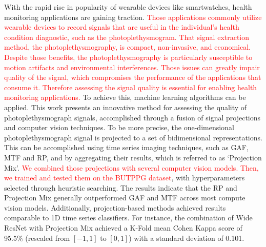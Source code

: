 

With the rapid rise in popularity of wearable devices like smartwatches, health monitoring applications are gaining traction. 
\textcolor{red}{Those applications commonly utilize wearable devices to record signals that are useful in the individual's health condition diagnostic, such as the photoplethysmogram. That signal extraction method, the photoplethysmography, is compact, non-invasive, and economical. Despite those benefits, the photoplethysmography is particularly susceptible to motion artifacts and environmental interferences. Those issues can greatly impair quality of the signal, which compromises the performance of the applications that consume it. Therefore  assessing the signal quality is essential for enabling health monitoring applications. }
%
To achieve this, machine learning algorithms can be applied. This work presents an innovative method for assessing the quality of photoplethysmograph signals, accomplished through a fusion of signal projections and computer vision techniques. To be more precise, the one-dimensional photoplethysmograph signal is projected to a set of bidimensional representations. This can be accomplished using time series imaging techniques, such as \acrlong{GAF}, \acrlong{MTF} and \acrlong{RP}, and by aggregating their results, which is referred to as `Projection Mix'. \textcolor{red}{We combined those projections with several computer vision models. Then, we trained and tested them on the \acrshort{BUTPPG} dataset}, with hyperparameters selected through heuristic searching. The results indicate that the \acrlong{RP} and Projection Mix generally outperformed \acrlong{GAF} and \acrlong{MTF} across most compute vision models. Additionally, projection-based methods achieved results comparable to 1D time series classifiers. For instance, the combination of Wide ResNet with Projection Mix achieved a K-Fold mean Cohen Kappa score of 95.5\% (rescaled from $[-1,1]$ to $[0,1]$) with a standard deviation of 0.101. 
